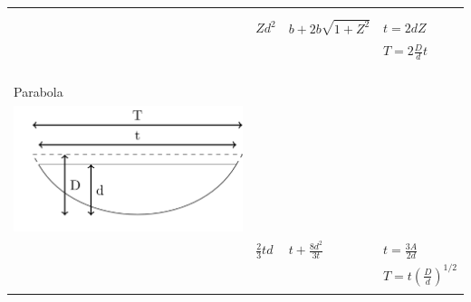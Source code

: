 \begin{table}[t]
\begin{tabular}{p{}p{}p{}p{}}
{ }   &   &   & \\
  &  &   & \\
  &  $Zd^2$   & $b+2b\sqrt{1+Z^2}$   &  $t = 2dZ$ \\
  &  &  &  $T =  2  \frac{D}{d} t$  \\
  &  &   & \\
  &  &  &  \\
  &  &  &  \\
  &  &  &  \\
  Parabola &  &  &  \\
 \multirow{2}{*}{
   \includegraphics[width=\linewidth]{./img/parabola.png}
 }   &   &  &  \\
  &  &  &  \\
  & $\frac{2}{3}td$  & $t + \frac{8d^2}{3t} $  & $t = \frac{3A}{2d}$ \\
  &  &   &  $T = t \left(\frac{D}{d}\right)^{1/2} $ \\
  &  &   & \\
\end{tabular}
\end{table}


